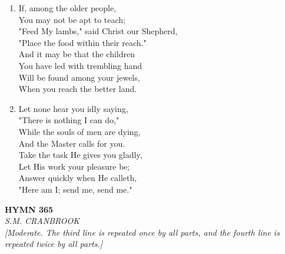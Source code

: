 \begin{enumerate}
    \item If, among the older people, \\
        You may not be apt to teach; \\
        "Feed My lambs," said Christ our Shepherd, \\
        "Place the food within their reach." \\
        And it may be that the children \\
        You have led with trembling hand \\
        Will be found among your jewels, \\
        When you reach the better land.

    \item Let none hear you idly saying, \\
        "There is nothing I can do," \\
        While the souls of men are dying, \\
        And the Master calls for you. \\
        Take the task He gives you gladly, \\
        Let His work your pleasure be; \\
        Answer quickly when He calleth, \\
        "Here am I; send me, send me."

\end{enumerate}

\newpage
\begin{center}
    {\Large \textbf{HYMN 365}}
    \\
    \textit{S.M. CRANBROOK}
    \\
    \textit{\small [Moderate. The third line is repeated once by all parts, and the fourth line is repeated twice by all parts.]}
\end{center}
\vspace{1em}

